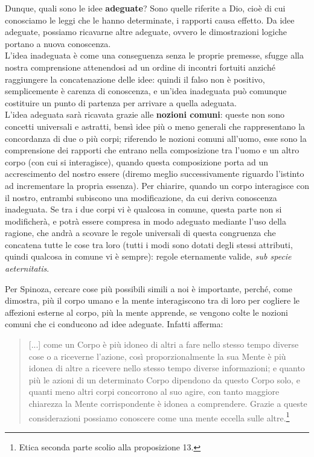 Dunque, quali sono le idee \textbf{adeguate}? Sono quelle riferite a Dio, cioè di cui conosciamo le leggi che le hanno determinate, i rapporti causa effetto. Da idee adeguate, possiamo ricavarne altre adeguate, ovvero le dimostrazioni logiche portano a nuova conoscenza.\\L'idea inadeguata è come una conseguenza senza le proprie premesse, sfugge alla nostra comprensione attenendosi ad un ordine di incontri fortuiti anziché raggiungere la concatenazione delle idee: quindi il falso non è positivo, semplicemente è carenza di conoscenza, e un'idea inadeguata può comunque costituire un punto di partenza per arrivare a quella adeguata.\\
L'idea adeguata sarà ricavata grazie alle \textbf{nozioni comuni}: queste non sono concetti universali e astratti, bensì idee più o meno generali che rappresentano la concordanza di due o più corpi; riferendo le nozioni comuni all'uomo, esse sono la comprensione dei rapporti che entrano nella composizione tra l'uomo e un altro corpo (con cui si interagisce), quando questa composizione porta ad un accrescimento del nostro essere (diremo meglio successivamente riguardo l'istinto ad incrementare la propria essenza). Per chiarire, quando un corpo interagisce con il nostro, entrambi subiscono una modificazione, da cui deriva conoscenza inadeguata. Se tra i due corpi vi è qualcosa in comune, questa parte non si modificherà, e potrà essere compresa in modo adeguato mediante l'uso della ragione, che andrà a scovare le regole universali di questa congruenza che concatena tutte le cose tra loro (tutti i modi sono dotati degli stessi attributi, quindi qualcosa in comune vi è sempre): regole eternamente valide, \textit{sub specie aeternitatis}.

Per Spinoza, cercare cose più possibili simili a noi è importante, perché, come dimostra, più il corpo umano e la mente interagiscono tra di loro per cogliere le affezioni esterne al corpo, più la mente apprende, se vengono colte le nozioni comuni che ci conducono ad idee adeguate. Infatti afferma:

\begin{quotation}
	\small [...] come un Corpo è più idoneo di altri a fare nello stesso tempo diverse cose o a riceverne l’azione, così proporzionalmente la sua Mente è più idonea di altre a ricevere nello stesso tempo diverse informazioni; e quanto più le azioni di un determinato Corpo dipendono da questo Corpo
	solo, e quanti meno altri corpi concorrono al suo agire, con tanto maggiore chiarezza la
	Mente corrispondente è idonea a comprendere. Grazie a queste considerazioni possiamo
	conoscere come una mente eccella sulle altre.\footnote{Etica seconda parte scolio alla proposizione 13.}
\end{quotation}

